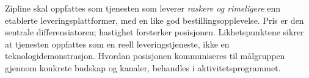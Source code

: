 \documentclass[12pt, a4paper]{article}
\begin{document}
\medskip

Zipline skal oppfattes som tjenesten som leverer \textit{raskere og
rimeligere} enn etablerte leveringsplattformer, med en like god
bestillingsopplevelse. Pris er den sentrale differensiatoren; hastighet
forsterker posisjonen. Likhetspunktene sikrer at tjenesten oppfattes som
en reell leveringstjeneste, ikke en teknologidemonstrasjon. Hvordan
posisjonen kommuniseres til målgruppen gjennom konkrete budskap og kanaler,
behandles i aktivitetsprogrammet.

\printbibliography[title={Referanseliste}]
\end{document}
